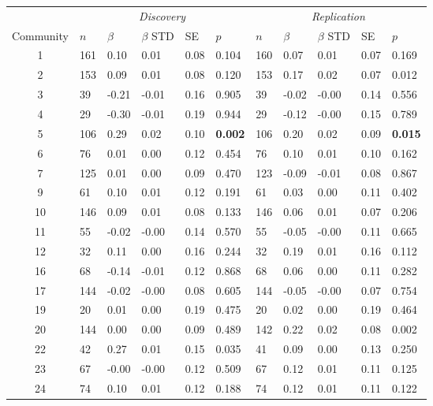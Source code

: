 \begin{table}[ht]
\centering
\setlength{\extrarowheight}{2pt}
\begin{tabular}{cllllllllll}
  \toprule
   &  \multicolumn{5}{c}{\textit{Discovery}} & \multicolumn{5}{c}{\textit{Replication}} \\
    \cmidrule{2-11}
Community & $n$ & $\beta$ & $\beta$ STD & SE & $p$ & $n$ & $\beta$ & $\beta$ STD & SE & $p$\\ 
  \midrule
1 & 161 & 0.10 & 0.01 & 0.08 & 0.104 & 160 & 0.07 & 0.01 & 0.07 & 0.169 \\ 
  2 & 153 & 0.09 & 0.01 & 0.08 & 0.120 & 153 & 0.17 & 0.02 & 0.07 & 0.012 \\ 
  3 & 39 & -0.21 & -0.01 & 0.16 & 0.905 & 39 & -0.02 & -0.00 & 0.14 & 0.556 \\ 
  4 & 29 & -0.30 & -0.01 & 0.19 & 0.944 & 29 & -0.12 & -0.00 & 0.15 & 0.789 \\ 
  5 & 106 & 0.29 & 0.02 & 0.10 & \textbf{0.002} & 106 & 0.20 & 0.02 & 0.09 & \textbf{0.015} \\ 
  6 & 76 & 0.01 & 0.00 & 0.12 & 0.454 & 76 & 0.10 & 0.01 & 0.10 & 0.162 \\ 
  7 & 125 & 0.01 & 0.00 & 0.09 & 0.470 & 123 & -0.09 & -0.01 & 0.08 & 0.867 \\ 
  9 & 61 & 0.10 & 0.01 & 0.12 & 0.191 & 61 & 0.03 & 0.00 & 0.11 & 0.402 \\ 
  10 & 146 & 0.09 & 0.01 & 0.08 & 0.133 & 146 & 0.06 & 0.01 & 0.07 & 0.206 \\ 
  11 & 55 & -0.02 & -0.00 & 0.14 & 0.570 & 55 & -0.05 & -0.00 & 0.11 & 0.665 \\ 
  12 & 32 & 0.11 & 0.00 & 0.16 & 0.244 & 32 & 0.19 & 0.01 & 0.16 & 0.112 \\ 
  16 & 68 & -0.14 & -0.01 & 0.12 & 0.868 & 68 & 0.06 & 0.00 & 0.11 & 0.282 \\ 
  17 & 144 & -0.02 & -0.00 & 0.08 & 0.605 & 144 & -0.05 & -0.00 & 0.07 & 0.754 \\ 
  19 & 20 & 0.01 & 0.00 & 0.19 & 0.475 & 20 & 0.02 & 0.00 & 0.19 & 0.464 \\ 
  20 & 144 & 0.00 & 0.00 & 0.09 & 0.489 & 142 & 0.22 & 0.02 & 0.08 & 0.002 \\ 
  22 & 42 & 0.27 & 0.01 & 0.15 & 0.035 & 41 & 0.09 & 0.00 & 0.13 & 0.250 \\ 
  23 & 67 & -0.00 & -0.00 & 0.12 & 0.509 & 67 & 0.12 & 0.01 & 0.11 & 0.125 \\ 
  24 & 74 & 0.10 & 0.01 & 0.12 & 0.188 & 74 & 0.12 & 0.01 & 0.11 & 0.122 \\ 

\end{tabular}
\end{table}
